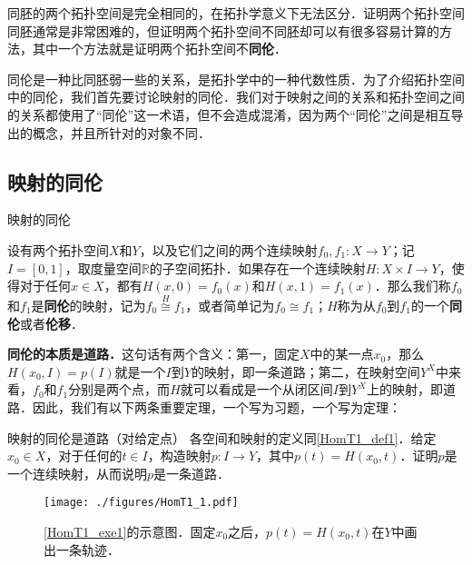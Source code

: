 
同胚的两个拓扑空间是完全相同的，在拓扑学意义下无法区分．证明两个拓扑空间同胚通常是非常困难的，但证明两个拓扑空间不同胚却可以有很多容易计算的方法，其中一个方法就是证明两个拓扑空间不\textbf{同伦}．

同伦是一种比同胚弱一些的关系，是拓扑学中的一种代数性质．为了介绍拓扑空间中的同伦，我们首先要讨论映射的同伦．我们对于映射之间的关系和拓扑空间之间的关系都使用了“同伦”这一术语，但不会造成混淆，因为两个“同伦”之间是相互导出的概念，并且所针对的对象不同．

\subsection{映射的同伦}

\begin{definition}{映射的同伦}\label{HomT1_def1}

设有两个拓扑空间$X$和$Y$，以及它们之间的两个连续映射$f_0, f_1:X\rightarrow Y$；记$I=[0, 1]$，取度量空间$\mathbb{R}$的子空间拓扑．如果存在一个连续映射$H: X\times I\rightarrow Y$，使得对于任何$x\in X$，都有$H(x, 0)=f_0(x)$和$H(x, 1)=f_1(x)$．那么我们称$f_0$和$f_1$是\textbf{同伦}的映射，记为$f_0\overset{H}{\cong} f_1$，或者简单记为$f_0\cong f_1$；$H$称为从$f_0$到$f_1$的一个\textbf{同伦}或者\textbf{伦移}．

\end{definition}

\textbf{同伦的本质是道路．}这句话有两个含义：第一，固定$X$中的某一点$x_0$，那么$H(x_0, I)=p(I)$就是一个$I$到$Y$的映射，即一条道路；第二，在映射空间$Y^X$中来看，$f_0$和$f_1$分别是两个点，而$H$就可以看成是一个从闭区间$I$到$Y^X$上的映射，即道路．因此，我们有以下两条重要定理，一个写为习题，一个写为定理：

\begin{exercise}{映射的同伦是道路（对给定点）}\label{HomT1_exe1}
各空间和映射的定义同\autoref{HomT1_def1}．给定$x_0\in X$，对于任何的$t\in I$，构造映射$p:I\rightarrow Y$，其中$p(t)=H(x_0, t)$．证明$p$是一个连续映射，从而说明$p$是一条道路．
\end{exercise}

\begin{figure}[ht]
\centering
\texttt{[image: ./figures/HomT1\_1.pdf]}
\caption{\autoref{HomT1_exe1}的示意图．固定$x_0$之后，$p(t)=H(x_0, t)$在$Y$中画出一条轨迹．} \label{HomT1_fig1}
\end{figure}

